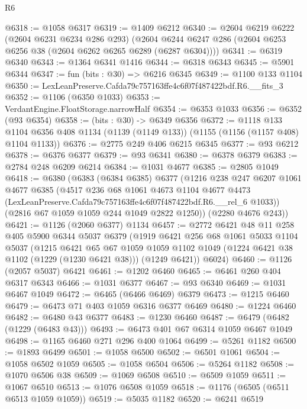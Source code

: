 \begin{lexlean}{R6}
\begin{coremodule}
@6318 := @1058 @6317
@6319 := @1409 @6212
@6340 := @2604
    @6219
    @6222
    (@2604 @6231 @6234 @286 @293)
    (@2604 @6244 @6247 @286 (@2604 @6253 @6256 @38 (@2604 @6262 @6265 @6289 (@6287 @6304))))
@6341 := @6319 @6340
@6343 := @1364 @6341 @1416
@6344 := @6318 @6343
@6345 := @5901 @6344
@6347 := fun (bits : @30) => @6216 @6345
@6349 := @1100 @133 @1104
@6350 := LexLeanPreserve.Cafda79c757163ffe4c6f07f487422bdf.R6.__fits_3
@6352 := @1106 (@6350 @1033)
@6353 := VerdantEngine.FloatStorage.narrowHalf
@6354 := @6353 @1033
@6356 := @6352 (@93 @6354)
@6358 := (bits : @30) -> @6349 @6356
@6372 := @1118
    @133
    @1104
    @6356
    @408
    @1134
    (@1139 (@1149 @133))
    (@1155 (@1156 (@1157 @408) @1104 @1133))
@6376 := @2775 @249 @406 @6215 @6345
@6377 := @93 @6212
@6378 := @6376 @6377
@6379 := @93 @6341
@6380 := @6378 @6379
@6383 := @2784 @248 @6209 @6214
@6384 := @1031 @4677
@6385 := @2805 @1049
@6418 := @6380
    (@6383
      (@6384 @6385)
      @6377
      (@1216
        @238
        @247
        @6207
        @1061
        @4677
        @6385
        (@4517
          @236
          @68
          @1061
          @4673
          @1104
          @4677
          @4473
          (LexLeanPreserve.Cafda79c757163ffe4c6f07f487422bdf.R6.__rel_6 @1033))
        (@2816 @67 @1059 @1059 @244 @1049 @2822 @1250))
      (@2280 @4676 @243))
@6421 := @1126 (@2060 @6377) @1134
@6457 := @2772
    @6421
    @48
    @11
    @258
    @405
    @5900
    @6344
    @5037
    @6379
    (@1919
      @6421
      @256
      @68
      @1061
      @5033
      @1104
      @5037
      (@1215
        @6421
        @65
        @67
        @1059
        @1059
        @1102
        @1049
        (@1224 @6421 @38 @1102 (@1229 (@1230 @6421 @38)))
        (@1249 @6421))
      @6024)
@6460 := @1126 (@2057 @5037) @6421
@6461 := @1202 @6460
@6465 := @6461 @260 @404 @6317 @6343
@6466 := @1031 @6377
@6467 := @93 @6340
@6469 := @1031 @6467 @1049
@6472 := @6465 (@6466 @6469) @6379
@6473 := @1215 @6460
@6479 := @6473 @71 @403 @1059 @6316 @6377 @6469
@6480 := @1224 @6460
@6482 := @6480 @43 @6377
@6483 := @1230 @6460
@6487 := @6479 (@6482 (@1229 (@6483 @43)))
@6493 := @6473 @401 @67 @6314 @1059 @6467 @1049
@6498 := @1165 @6460 @271 @296 @400 @1064
@6499 := @5261 @1182
@6500 := @1893 @6499
@6501 := @1058 @6500
@6502 := @6501 @1061
@6504 := @1058 @6502 @1059
@6505 := @1058 @6504
@6506 := @5264 @1182
@6508 := @1070 @6506 @38
@6509 := @1069 @6508
@6510 := @6509 @1059
@6511 := @1067 @6510
@6513 := @1076 @6508 @1059
@6518 := @1176 (@6505 (@6511 @6513 @1059 @1059))
@6519 := @5035 @1182
@6520 := @6241 @6519

\end{coremodule}
\end{lexlean}
